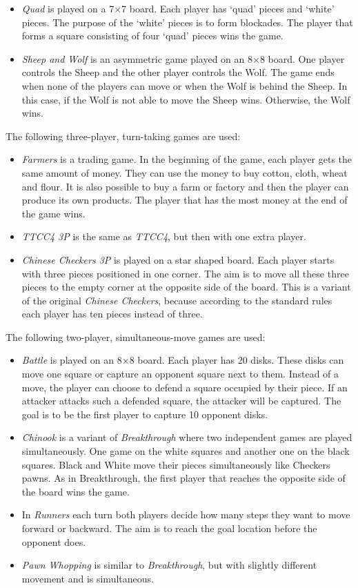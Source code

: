 \documentclass[journal]{IEEEtran}
\begin{document}
\begin{itemize}
\item \textit{Quad} is played on a 7$\times$7 board. Each player has `quad' pieces and `white' pieces. The purpose of the `white' pieces is to form blockades. The player that forms a square consisting of four `quad' pieces wins the game.
\item \textit{Sheep and Wolf} is an asymmetric game played on an 8$\times$8 board. One player controls the Sheep and the other player controls the Wolf. The game ends when none of the players can move or when the Wolf is behind the Sheep. In this case, if the Wolf is not able to move the Sheep wins. Otherwise, the Wolf wins.
\end{itemize}
The following three-player, turn-taking games are used:
\begin{itemize}
\item \textit{Farmers} is a trading game. In the beginning of the game, each player gets the same amount of money. They can use the money to buy cotton, cloth, wheat and flour. It is also possible to buy a farm or factory and then the player can produce its own products. The player that has the most money at the end of the game wins. 
\item \textit{TTCC4 3P} is the same as \textit{TTCC4}, but then with one extra player.
\item \textit{Chinese Checkers 3P} is played on a star shaped board. Each player starts with three pieces positioned in one corner. The aim is to move all these three pieces to the empty corner at the opposite side of the board. This is a variant of the original \textit{Chinese Checkers}, because according to the standard rules each player has ten pieces instead of three.
\end{itemize}
The following two-player, simultaneous-move games are used:
\begin{itemize}
\item \textit{Battle} is played on an 8$\times$8 board. Each player has 20 disks. These disks can move one square or capture an opponent square next to them. Instead of a move, the player can choose to defend a square occupied by their piece. If an attacker attacks such a defended square, the attacker will be captured. The goal is to be the first player to capture 10 opponent disks. 
\item \textit{Chinook} is a variant of \textit{Breakthrough} where two independent games are played simultaneously. One game on the white squares and another one on the black squares. Black and White move their pieces simultaneously like Checkers pawns. As in Breakthrough, the first player that reaches the opposite side of the board wins the game. 
\item In \textit{Runners} each turn both players decide how many steps they want to move forward or backward. The aim is to reach the goal location before the opponent does.
\item \textit{Pawn Whopping} is similar to \textit{Breakthrough}, but with slightly different movement and is simultaneous.
\end{itemize}
\end{document}

